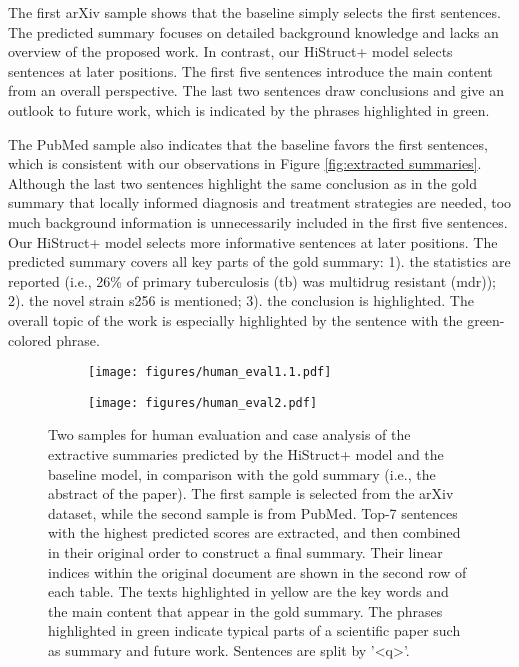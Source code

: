 \documentclass[11pt]{article}
\begin{document}
The first arXiv sample shows that the baseline simply selects the first sentences. The predicted summary focuses on detailed background knowledge and lacks an overview of the proposed work. In contrast, our HiStruct+ model selects sentences at later positions. The first five sentences introduce the main content from an overall perspective. The last two sentences draw conclusions and give an outlook to future work, which is indicated by the phrases highlighted in green. 

The PubMed sample also indicates that the baseline favors the first sentences, which is consistent with our observations in Figure \ref{fig:extracted summaries}. Although the last two sentences highlight the same conclusion as in the gold summary that locally informed diagnosis and treatment strategies are needed, too much background information is unnecessarily included in the first five sentences. Our HiStruct+ model selects more informative sentences at later positions. The predicted summary covers all key parts of the gold summary: 1). the statistics are reported (i.e.,  26\% of primary tuberculosis (tb) was multidrug resistant (mdr)); 2). the novel strain s256 is mentioned; 3). the conclusion is highlighted. The overall topic of the work is especially highlighted by the sentence with the green-colored phrase.  



\begin{figure*}[ht]
\begin{subfigure}{1\textwidth}
  \centering
  \texttt{[image: figures/human\_eval1.1.pdf]}
  \label{fig:human_eval1.1}
\end{subfigure}
\begin{subfigure}{1\textwidth}
  \centering
  \texttt{[image: figures/human\_eval2.pdf]}
  \label{fig:human_eval2}
\end{subfigure}
\caption{Two samples for human evaluation and case analysis of the extractive summaries predicted by the HiStruct+ model and the baseline model, in comparison with the gold summary (i.e., the abstract of the paper). The first sample is selected from the arXiv dataset, while the second sample is from PubMed. Top-7 sentences with the highest predicted scores are extracted, and then combined in their original order to construct a final summary. Their linear indices within the original document are shown in the second row of each table. The texts highlighted in yellow are the key words and the main content that appear in the gold summary. The phrases highlighted in green indicate typical parts of a scientific paper such as summary and future work. Sentences are split by '<q>'.}
\label{fig:human evaluation}
\end{figure*}

\clearpage
\end{document}
